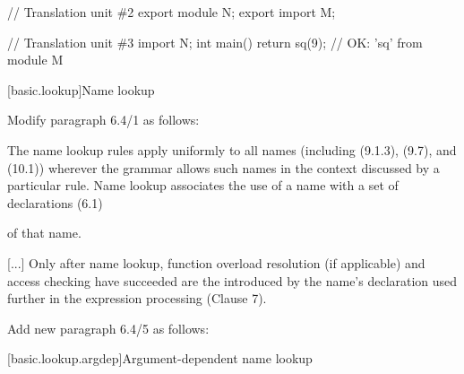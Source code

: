 \begin{std.txt}
\begin{codeblock}
    // Translation unit \#2
    export module N;
    export import M;

    // Translation unit \#3
    import N;
    int main() { return sq(9); }       // OK: 'sq' from module M
    \end{codeblock}
    \exitexample
\end{std.txt}


\setcounter{section}{3}
[basic.lookup]{Name lookup}

Modify paragraph 6.4/1 as follows:
\begin{std.txt}
  \resetalinea[0]
  \alinea
  The name lookup rules apply uniformly to all names
  (including  (9.1.3),
   (9.7), and 
   (10.1))
  wherever the grammar allows such names in the context discussed by a 
  particular rule.
  Name lookup associates the use of a name with a set of declarations (6.1)
\begin{before}
\end{before}
  of that name.
\begin{before}
\end{before}
  [...] Only after name lookup, function overload resolution (if applicable)
  and access checking have succeeded are the
   introduced by
  the name's declaration
  used further in the expression processing (Clause 7).
\end{std.txt}

\begin{before}
Add new paragraph 6.4/5 as follows:
\begin{std.txt}\color{addclr}
  \resetalinea[4]
  \alinea
\end{std.txt}
\end{before}

\setcounter{subsection}{1}
[basic.lookup.argdep]{Argument-dependent name lookup}

